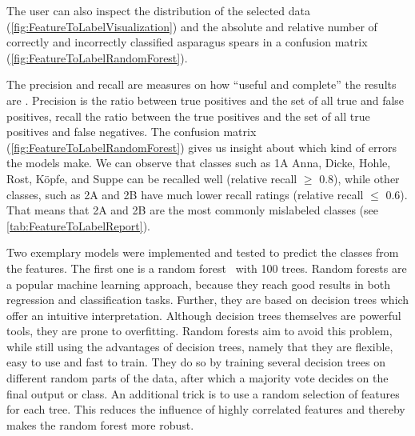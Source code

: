 
The user can also inspect the distribution of the selected data (\autoref{fig:FeatureToLabelVisualization}) and the absolute and relative number of correctly and incorrectly classified asparagus spears in a confusion matrix (\autoref{fig:FeatureToLabelRandomForest}).

The precision and recall are measures on how \enquote{useful and complete} the results are \citep{wiki:precisionrecall}. Precision is the ratio between true positives and the set of all true and false positives, recall the ratio between the true positives and the set of all true positives and false negatives. The confusion matrix (\autoref{fig:FeatureToLabelRandomForest}) gives us insight about which kind of errors the models make. We can observe that classes such as 1A Anna, Dicke, Hohle, Rost, Köpfe, and Suppe can be recalled well (relative recall $\geq$ 0.8), while other classes, such as 2A and 2B have much lower recall ratings (relative recall $\leq$ 0.6). That means that 2A and 2B are the most commonly mislabeled classes (see \autoref{tab:FeatureToLabelReport}).

\bigskip
Two exemplary models were implemented and tested to predict the classes from the features. The first one is a random forest~\citep{breiman2001random} with 100 trees.
Random forests are a popular machine learning approach, because they reach good results in both regression and classification tasks. Further, they are based on decision trees which offer an intuitive interpretation. Although decision trees themselves are powerful tools, they are prone to overfitting. Random forests aim to avoid this problem, while still using the advantages of decision trees, namely that they are flexible, easy to use and fast to train. They do so by training several decision trees on different random parts of the data, after which a majority vote decides on the final output or class. An additional trick is to use a random selection of features for each tree. This reduces the influence of highly correlated features and thereby makes the random forest more robust. 

